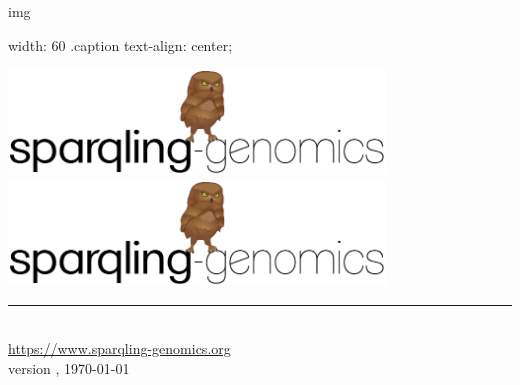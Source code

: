 \documentclass[11pt,a4paper,oneside]{book}
\begin{document}
img { width: 60%
.caption { text-align: center; }
\EndCssFile
\fi

\begin{titlepage}
  \vspace*{\fill}
  \begin{center}
    \ifdefined\HCode
    \includegraphics[width=0.75\textwidth]{figures/logo.pdf}~\\
    \else
    \includegraphics[width=0.75\textwidth]{figures/logo.pdf}
    \fi
    \rule{0.75\textwidth}{1.0pt}~\\
    \url{https://www.sparqling-genomics.org}~\\
    \large version \sgversion{}, \today{}
    \ifdefined\HCode
    \else
    ~\\~\\~\\~\\~\\~\\~\\~\\~\\~\\~\\~\\~\\~\\
    \fi
  \end{center}
  \vspace*{\fill}

  \thispagestyle{empty}
\end{titlepage}

\setcounter{page}{1}
\hypersetup{linkcolor=black}

}
\end{document}
